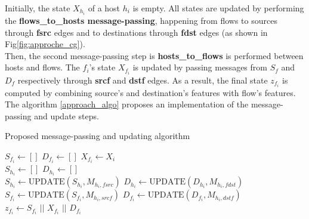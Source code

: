  Initially, the state $X_{h_i}$ of a host $h_i$ is empty. All states are updated by performing the \textbf{flows\_to\_hosts message-passing}, happening from flows to sources through \textbf{fsrc} edges and  to destinations through \textbf{fdst} edges (as shown in Fig\ref{fig:approche_cg}).\\
Then, the second message-passing step is \textbf{hosts\_to\_flows} is performed between hosts and flows. The $f_i$'s state $X_{f_i}$ is updated by passing messages from $S_f$ and $D_f$ respectively through \textbf{srcf} and \textbf{dstf} edges. As a result, the final state  $z_{f_i}$ is computed by combining source's and destination's features with flow's features.\\
The algorithm \ref{approach_algo} proposes an implementation of the message-passing and update steps.\\
\begin{algorithm}[H]
\caption{Proposed message-passing and updating algorithm}\label{approach_algo}
\begin{algorithmic}
\STATE $S_{f_{i}}\leftarrow  []$
\STATE $D_{f_{i}}\leftarrow  []$
\STATE $X_{f_{i}}\leftarrow  X_i$
\ENDFOR\\
\STATE $S_{h_{i}}\leftarrow  []$
\STATE $D_{h_{i}}\leftarrow  []$
\ENDFOR\\
\STATE $S_{h_{i}}\leftarrow  \text{UPDATE}(S_{h_{i}}, M_{h_i,fsrc})$
\STATE $D_{h_{i}}\leftarrow  \text{UPDATE}(D_{h_{i}}, M_{h_i,fdst})$
\ENDFOR
{}
\STATE $S_{f_{i}}\leftarrow  \text{UPDATE}(S_{f_{i}}, M_{h_i,srcf})$
\STATE $D_{f_{i}}\leftarrow  \text{UPDATE}(D_{f_{i}}, M_{h_i,dstf})$
\STATE $z_{f_i} \leftarrow S_{f_{i}} \text{ || } X_{f_{i}} \text{ || } D_{f_{i}} $
\ENDFOR
\end{algorithmic}
\end{algorithm}

